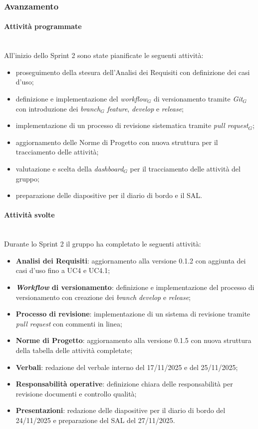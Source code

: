 \documentclass[10pt, letterpaper]{article}
\newcommand{\trisubsection}[1]{\paragraph{#1}\mbox{}\\}
\begin{document}
\subsubsection{Avanzamento}
\trisubsection{Attività programmate}
All'inizio dello Sprint 2 sono state pianificate le seguenti attività:
\begin{itemize}
    \item proseguimento della stesura dell'Analisi dei Requisiti con definizione dei casi d'uso;
    \item definizione e implementazione del \textit{workflow$_G$} di versionamento tramite \textit{Git$_G$} con introduzione dei \textit{branch$_G$} \textit{feature}, \textit{develop} e \textit{release};
    \item implementazione di un processo di revisione sistematica tramite \textit{pull request$_G$};
    \item aggiornamento delle Norme di Progetto con nuova struttura per il tracciamento delle attività;
    \item valutazione e scelta della \textit{dashboard$_G$} per il tracciamento delle attività del gruppo;
    \item preparazione delle diapositive per il diario di bordo e il SAL.
\end{itemize}

\trisubsection{Attività svolte}
Durante lo Sprint 2 il gruppo ha completato le seguenti attività:
\begin{itemize}
    \item \textbf{Analisi dei Requisiti}: aggiornamento alla versione 0.1.2 con aggiunta dei casi d'uso fino a UC4 e UC4.1;
    \item \textbf{\textit{Workflow} di versionamento}: definizione e implementazione del processo di versionamento con creazione dei \textit{branch} \textit{develop} e \textit{release};
    \item \textbf{Processo di revisione}: implementazione di un sistema di revisione tramite \textit{pull request} con commenti in linea;
    \item \textbf{Norme di Progetto}: aggiornamento alla versione 0.1.5 con nuova struttura della tabella delle attività completate;
    \item \textbf{Verbali}: redazione del verbale interno del 17/11/2025 e del 25/11/2025;
    \item \textbf{Responsabilità operative}: definizione chiara delle responsabilità per revisione documenti e controllo qualità;
    \item \textbf{Presentazioni}: redazione delle diapositive per il diario di bordo del 24/11/2025 e preparazione del SAL del 27/11/2025.
\end{itemize}
\end{document}
